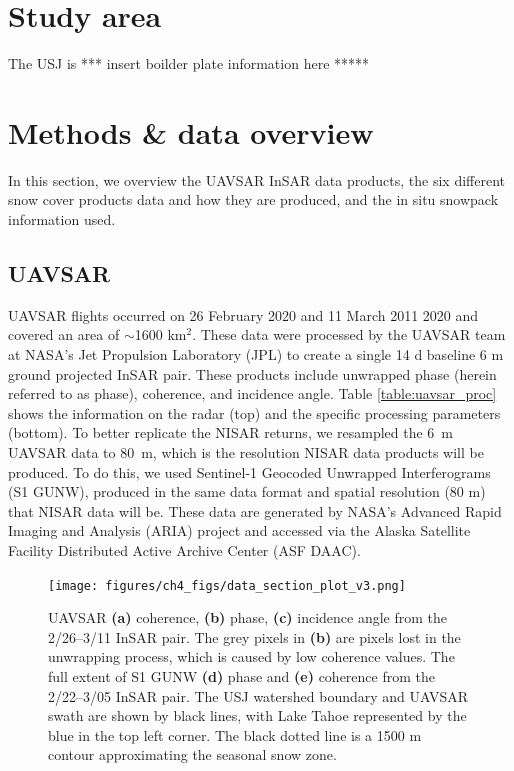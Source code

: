 \hypertarget{ch4-methods}{\section{Study area}\label{ch4-methods}}

The USJ is *** insert boilder plate information here *****

\hypertarget{ch4-methods}{\section{Methods \& data overview}\label{ch4-methods}}
In this section, we overview the UAVSAR InSAR data products, the six different snow cover products data and how they are produced, and the in situ snowpack information used.

\hypertarget{ch4-methods-1}{\subsection{UAVSAR}\label{ch4-methods-1}}

UAVSAR flights occurred on 26 February 2020 and 11 March 2011 2020 and covered an area of $\sim$1600 km$^{2}$. These data were processed by the UAVSAR team at NASA's Jet Propulsion Laboratory (JPL) to create a single 14 d baseline 6 m ground projected InSAR pair. These products include unwrapped phase (herein referred to as phase), coherence, and incidence angle. Table \ref{table:uavsar_proc} shows the information on the radar (top) and the specific processing parameters (bottom). To better replicate the NISAR returns, we resampled the 6~m UAVSAR data to 80~m, which is the resolution NISAR data products will be produced. To do this, we used Sentinel-1 Geocoded Unwrapped Interferograms (S1 GUNW), produced in the same data format and spatial resolution (80 m) that NISAR data will be. These data are generated by NASA's Advanced Rapid Imaging and Analysis (ARIA) \citep{bekaertDevelopmentDisseminationStandardized2019,buzzangaSustainedMonitoringSubsidence2020} project and accessed via the Alaska Satellite Facility Distributed Active Archive Center (ASF DAAC).


\begin{figure}[ht]
\texttt{[image: figures/ch4\_figs/data\_section\_plot\_v3.png]}
\centering
\caption{UAVSAR \textbf{(a)} coherence, \textbf{(b)} phase, \textbf{(c)} incidence angle from the 2/26--3/11 InSAR pair. The grey pixels in \textbf{(b)} are pixels lost in the unwrapping process, which is caused by low coherence values. The full extent of S1 GUNW \textbf{(d)} phase and \textbf{(e)} coherence from the 2/22--3/05 InSAR pair. The USJ watershed boundary and UAVSAR swath are shown by black lines, with Lake Tahoe represented by the blue in the top left corner. The black dotted line is a 1500 m contour approximating the seasonal snow zone.}
\label{fig:uavsar_cor_inc_phase_plot}
\end{figure}
\clearpage

